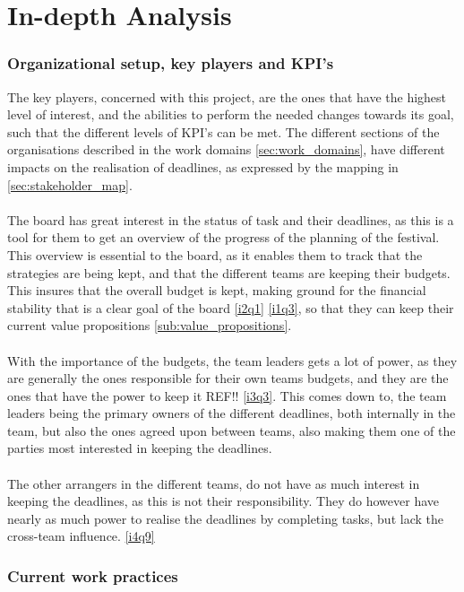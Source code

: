 \part{In-depth Analysis}
\label{prt:in_depth_analysis}
\section{Organizational setup, key players and KPI's}
The key players, concerned with this project, are the ones that have the highest level of interest, and the abilities to perform the needed changes towards its goal, such that the different levels of KPI's can be met. The different sections of the organisations described in the work domains \ref{sec:work_domains}, have different impacts on the realisation of deadlines, as expressed by the mapping in \ref{sec:stakeholder_map}.
\\ \\
The board has great interest in the status of task and their deadlines, as this is a tool for them to get an overview of the progress of the planning of the festival. This overview is essential to the board, as it enables them to track that the strategies are being kept, and that the different teams are keeping their budgets. This insures that the overall budget is kept, making ground for the financial stability that is a clear goal of the board \ref{i2q1} \ref{i1q3}, so that they can keep their current value propositions \ref{sub:value_propositions}.
\\ \\
With the importance of the budgets, the team leaders gets a lot of power, as they are generally the ones responsible for their own teams budgets, and they are the ones that have the power to keep it REF!! \ref{i3q3}. This comes down to, the team leaders being the primary owners of the different deadlines, both internally in the team, but also the ones agreed upon between teams, also making them one of the parties most interested in keeping the deadlines.
\\ \\
The other arrangers in the different teams, do not have as much interest in keeping the deadlines, as this is not their responsibility. They do however have nearly as much power to realise the deadlines by completing tasks, but lack the cross-team influence. \ref{i4q9}


\section{Current work practices}

